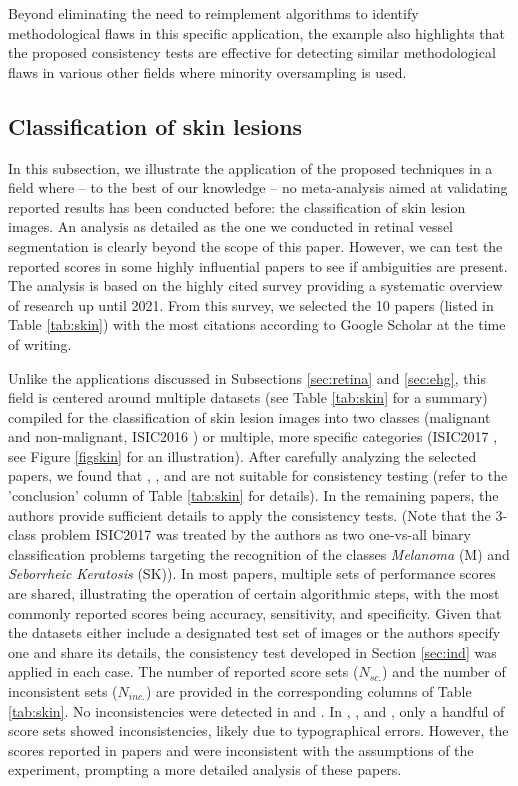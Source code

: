 \documentclass[3p, times]{elsarticle}
\begin{document}
Beyond eliminating the need to reimplement algorithms to identify methodological flaws in this specific application, the example also highlights that the proposed consistency tests are effective for detecting similar methodological flaws in various other fields where minority oversampling \cite{smote} is used.

\subsection{Classification of skin lesions}
\label{sec:third}

In this subsection, we illustrate the application of the proposed techniques in a field where -- to the best of our knowledge -- no meta-analysis aimed at validating  reported results has been conducted before: the classification of skin lesion images. An analysis as detailed as the one we conducted in retinal vessel segmentation \cite{vessel} is clearly beyond the scope of this paper. However, we can test the reported scores in some highly influential papers to see if ambiguities are present. The analysis is based on the highly cited survey \cite{skinsurvey} providing a systematic overview of research up until 2021. From this survey, we selected the 10 papers (listed in Table \ref{tab:skin}) with the most citations according to Google Scholar at the time of writing.

Unlike the applications discussed in Subsections \ref{sec:retina} and \ref{sec:ehg}, this field is centered around multiple datasets (see Table \ref{tab:skin} for a summary) compiled for the classification of skin lesion images into two classes (malignant and non-malignant, ISIC2016 \cite{isic2016}) or multiple, more specific categories (ISIC2017 \cite{isic2017}, see Figure \ref{figskin} for an illustration). After carefully analyzing the selected papers, we found that \cite{skin1}, \cite{skin4}, and \cite{skin6} are not suitable for consistency testing (refer to the 'conclusion' column of Table \ref{tab:skin} for details). In the remaining papers, the authors provide sufficient details to apply the consistency tests. (Note that the 3-class problem ISIC2017 \cite{isic2017} was treated by the authors as two one-vs-all binary classification problems targeting the recognition of the classes \emph{Melanoma} (M) and \emph{Seborrheic Keratosis} (SK)). 
In most papers, multiple sets of performance scores are shared, illustrating the operation of certain algorithmic steps, with the most commonly reported scores being accuracy, sensitivity, and specificity. Given that the datasets either include a designated test set of images or the authors specify one and share its details, the consistency test developed in Section \ref{sec:ind} was applied in each case. The number of reported score sets ($N_{sc.}$) and the number of inconsistent sets ($N_{inc.}$) are provided in the corresponding columns of Table \ref{tab:skin}. No inconsistencies were detected in \cite{skin5} and \cite{skin8}. In \cite{skin0}, \cite{skin2}, and \cite{skin3}, only a handful of score sets showed inconsistencies, likely due to typographical errors. However, the scores reported in papers \cite{skin7} and \cite{skin9} were inconsistent with the assumptions of the experiment, prompting a more detailed analysis of these papers.
\end{document}
